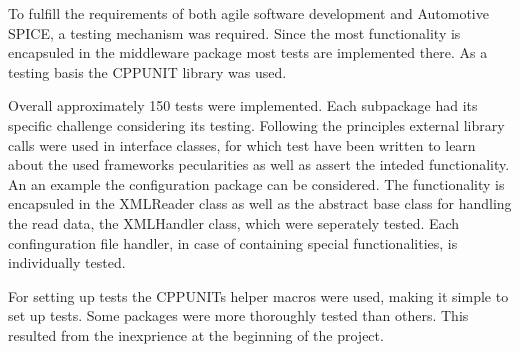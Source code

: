 To fulfill the requirements of both agile software development and Automotive SPICE, a testing mechanism was required. Since the most functionality
is encapsuled in the middleware package most tests are implemented there. As a testing basis the CPPUNIT library was used. 

Overall approximately 150 tests were implemented. Each subpackage had its specific challenge considering 
its testing. Following the  principles external library calls were used 
in interface classes, for which test have been written to learn about the used frameworks pecularities 
as well as assert the inteded functionality. An an example the configuration package can be considered. 
The functionality is encapsuled in the XMLReader class as well as the abstract base class for 
handling the read data, the XMLHandler class, which were seperately tested. Each confinguration 
file handler, in case of containing special functionalities, is individually tested.

For setting up tests the CPPUNITs helper macros were used, making it simple to set up tests. Some 
packages were more thoroughly tested than others. This resulted from the inexprience at the 
beginning of the project.


